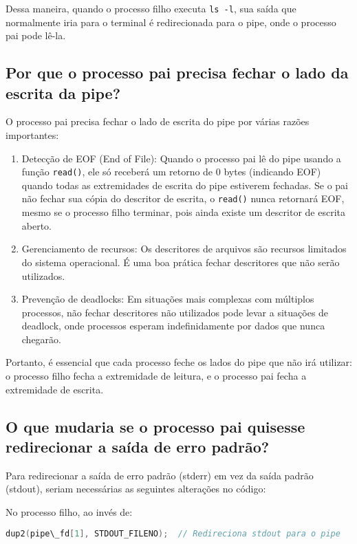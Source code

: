 \documentclass[12pt]{article}
\begin{document}
Dessa maneira, quando o processo filho executa \texttt{ls -l}, sua saída que normalmente iria para o terminal é redirecionada para o pipe, onde o processo pai pode lê-la.

\subsection{Por que o processo pai precisa fechar o lado da escrita da pipe?}

O processo pai precisa fechar o lado de escrita do pipe por várias razões importantes:

\begin{enumerate}
    \item Detecção de EOF (End of File): Quando o processo pai lê do pipe usando a função \texttt{read()}, ele só receberá um retorno de 0 bytes (indicando EOF) quando todas as extremidades de escrita do pipe estiverem fechadas. Se o pai não fechar sua cópia do descritor de escrita, o \texttt{read()} nunca retornará EOF, mesmo se o processo filho terminar, pois ainda existe um descritor de escrita aberto.

    \item Gerenciamento de recursos: Os descritores de arquivos são recursos limitados do sistema operacional. É uma boa prática fechar descritores que não serão utilizados.

    \item Prevenção de deadlocks: Em situações mais complexas com múltiplos processos, não fechar descritores não utilizados pode levar a situações de deadlock, onde processos esperam indefinidamente por dados que nunca chegarão.
\end{enumerate}

Portanto, é essencial que cada processo feche os lados do pipe que não irá utilizar: o processo filho fecha a extremidade de leitura, e o processo pai fecha a extremidade de escrita.

\subsection{O que mudaria se o processo pai quisesse redirecionar a saída de erro padrão?}

Para redirecionar a saída de erro padrão (stderr) em vez da saída padrão (stdout), seriam necessárias as seguintes alterações no código:

No processo filho, ao invés de:
\begin{lstlisting}[language=C]
dup2(pipe\_fd[1], STDOUT_FILENO);  // Redireciona stdout para o pipe
\end{lstlisting}
\end{document}
